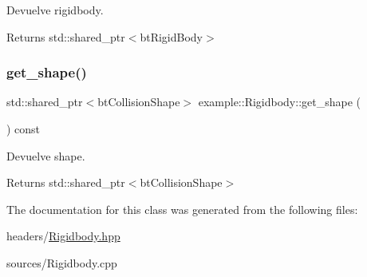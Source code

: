 Devuelve rigidbody. 

\begin{DoxyReturn}{Returns}
std\+::shared\+\_\+ptr$<$bt\+Rigid\+Body$>$ 
\end{DoxyReturn}
\mbox{\label{classexample_1_1_rigidbody_ad5b6d14eddbb8d0f0d2b99cff44178b9}} 
\subsubsection{\texorpdfstring{get\_shape()}{get\_shape()}}
{\footnotesize\ttfamily std\+::shared\+\_\+ptr$<$bt\+Collision\+Shape$>$ example\+::\+Rigidbody\+::get\+\_\+shape (\begin{DoxyParamCaption}{ }\end{DoxyParamCaption}) const\hspace{0.3cm}{\ttfamily [inline]}}



Devuelve shape. 

\begin{DoxyReturn}{Returns}
std\+::shared\+\_\+ptr$<$bt\+Collision\+Shape$>$ 
\end{DoxyReturn}


The documentation for this class was generated from the following files\+:\begin{DoxyCompactItemize}
\item 
headers/\mbox{\hyperlink{_rigidbody_8hpp}{Rigidbody.\+hpp}}\item 
sources/Rigidbody.\+cpp\end{DoxyCompactItemize}
